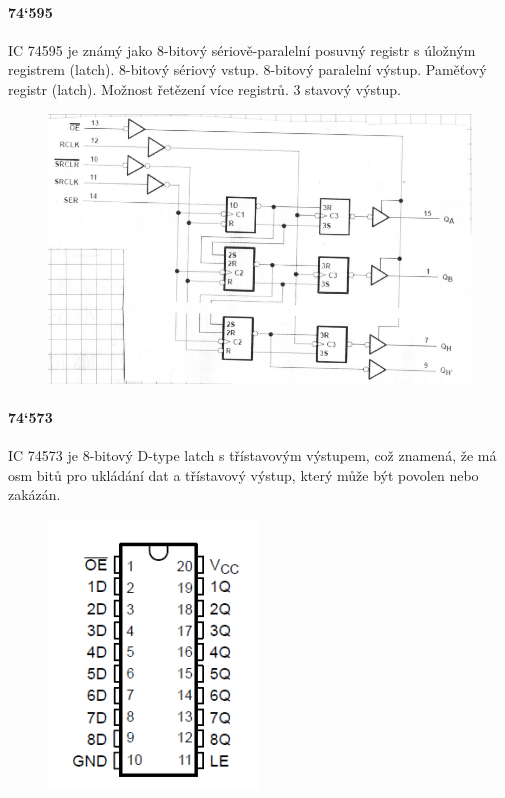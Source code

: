 \paragraph{74`595}
IC 74595 je známý jako 8-bitový sériově-paralelní posuvný registr s úložným registrem (latch). 8-bitový sériový vstup. 8-bitový paralelní výstup. Paměťový registr (latch). Možnost řetězení více registrů. 3 stavový výstup.
\begin{figure}[htbp]
\centering
\includegraphics[scale=0.3]{sections/3_pld_npld/images/74595.png}
\end{figure}
\paragraph{74`573}
IC 74573 je 8-bitový D-type latch s třístavovým výstupem, což znamená, že má osm bitů pro ukládání dat a třístavový výstup, který může být povolen nebo zakázán.
\begin{figure}[h]
\centering
\includegraphics[scale=0.5]{sections/3_pld_npld/images/74573.png}
\end{figure}
\newpage
